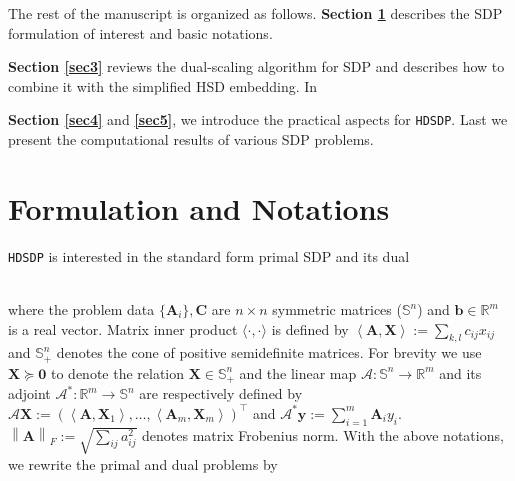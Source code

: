 \documentclass[10pt]{article}
\begin{document}
The rest of the manuscript is organized as follows. \textbf{Section \ref{sec2}} 
describes the SDP formulation of interest and basic notations.
{\textbf{Section \ref{sec3}} reviews the dual-scaling algorithm for SDP
and describes how to combine it with the simplified HSD embedding. In {\textbf{Section
\ref{sec4}} and \textbf{\ref{sec5}}, we introduce the practical aspects for {{\texttt{HDSDP}}}. 
Last we present the computational results of various SDP problems.

\section{Formulation and Notations} \label{sec2}

{{\texttt{HDSDP}}} is interested in the standard form primal SDP and its dual

{}\\

where the problem data $\{\mathbf{A}_i\}, \mathbf{C}$ are $n \times n$ symmetric matrices
($\mathbb{S}^n$) and $\mathbf{b} \in \mathbb{R}^m$ is a real vector. Matrix inner
product $\langle \cdot, \cdot \rangle$ is defined by $\left\langle \mathbf{A}, \mathbf{X} \right\rangle := \sum_{k, l}
c_{i j} x_{i j}$ and $\mathbb{S}_+^n$ denotes the cone of positive
semidefinite matrices. For brevity we use $\mathbf{X} \succeq \textbf{0}$ to denote the
relation $\mathbf{X} \in \mathbb{S}_+^n$ and the linear map $\mathcal{A} : \mathbb{S}^n
\rightarrow \mathbb{R}^m$ and its adjoint $\mathcal{A}^{\ast} : \mathbb{R}^m
\rightarrow \mathbb{S}^n$ are respectively defined by $\mathcal{A} \mathbf{X} := \left(
\left\langle \mathbf{A}, \mathbf{X}_1 \right\rangle, \ldots, \left\langle \mathbf{A}_m, \mathbf{X}_m
\right\rangle \right)^{\top}$ and $\mathcal{A}^{\ast} \mathbf{y} := \sum_{i = 1}^m \mathbf{A}_i
y_i$. $\left\| \mathbf{A} \right\|_F := \sqrt{\sum_{i j} a_{i j}^2}$ denotes
matrix Frobenius norm. With the above notations, we rewrite the primal and
dual problems by

}}
\end{document}
